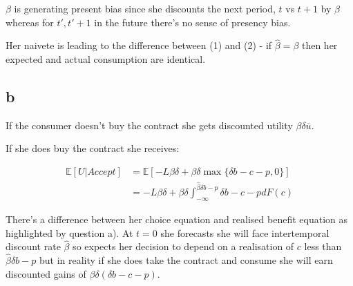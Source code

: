 \documentclass{article}
\begin{document}
$\beta$ is generating present bias since she discounts the next period, $t$ vs 
$t+1$ by $\beta$ whereas for $t', t'+1$ in the future there's no sense of 
presency bias.


Her naivete is leading to the difference between (1) and (2) - if $\hat{\beta} = \beta$
then her expected and actual consumption are identical.


\subsection*{b}


If the consumer doesn't buy the contract she gets discounted utility $\beta \delta \overline{u}$.

If she does buy the contract she receives:

\begin{align*}
    \mathbb{E}[U | \textit{Accept}] &= \mathbb{E}\left[ 
        -L\beta \delta + \beta \delta \max\{\delta b - c - p, 0\} 
    \right] \\
    &= -L \beta \delta + \beta \delta \int^{\hat{\beta}\delta b - p}_{-\infty} \delta b - c - p dF(c)
\end{align*}


There's a difference between her choice equation and realised benefit equation as 
highlighted by question a). At $t=0$ she forecasts she will face intertemporal 
discount rate $\hat{\beta}$ so expects her decision to depend on a realisation of 
$c$ less than $\hat{\beta}\delta b - p$ but in reality if she does take the 
contract and consume she will earn discounted gains of $\beta \delta (\delta b - c - p)$. 
\end{document}
